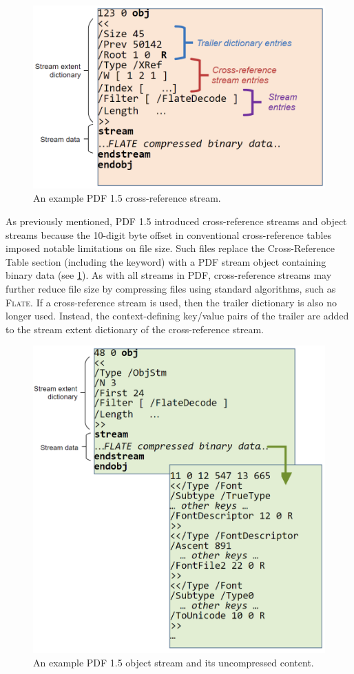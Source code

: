 \begin{figure}[t]
    \centering
    \includegraphics[width=0.65\linewidth]{figures/xrefstm.png}
    \caption{An example PDF 1.5 cross-reference stream.}
    \label{fig:XRefStm}
\end{figure}

As previously mentioned, PDF 1.5 introduced cross-reference streams
and object streams because the 10-digit byte offset in conventional
cross-reference tables imposed notable limitations on file size.
%
Such files replace the Cross-Reference Table section (including the
 keyword) with a PDF stream object containing binary data
(see \cref{fig:XRefStm}).
%
As with all streams in PDF, cross-reference streams may further reduce
file size by compressing files using standard algorithms, such as
\textsc{Flate}.
%
If a cross-reference stream is used, then the trailer dictionary is
also no longer used.
%
Instead, the context-defining key/value pairs of the trailer are added
to the stream extent dictionary of the cross-reference stream.

\begin{figure}[t]
    \centering
    \includegraphics[width=0.65\linewidth]{figures/ObjStm.png}
    \caption{An example PDF 1.5 object stream and its uncompressed
      content.}
    \label{fig:ObjStm}
\end{figure}

